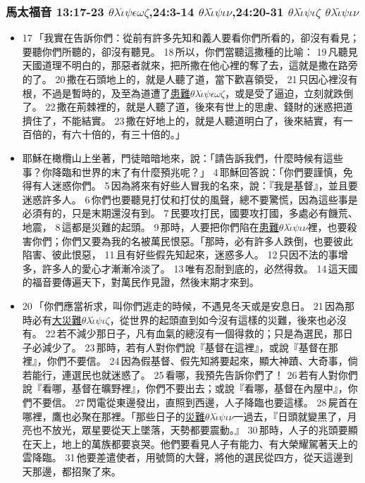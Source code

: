 \subsubsection{馬太福音 13:17-23 $\theta$$\lambda$$\acute{\iota}$$\psi$$\epsilon$$\omega$$\zeta$,24:3-14 $\theta$$\lambda$$\tilde{\iota}$$\psi$$\iota$$\nu$,24:20-31 $\theta$$\lambda$$\tilde{\iota}$$\psi$$\iota$$\zeta$ $\theta$$\lambda$$\tilde{\iota}$$\psi$$\iota$$\nu$}    
\begin{itemize} 
\itemsep-.25em
\item 17 「我實在告訴你們：從前有許多先知和義人要看你們所看的，卻沒有看見；要聽你們所聽的，卻沒有聽見。 18 所以，你們當聽這撒種的比喻： 19 凡聽見天國道理不明白的，那惡者就來，把所撒在他心裡的奪了去，這就是撒在路旁的了。 20 撒在石頭地上的，就是人聽了道，當下歡喜領受， 21 只因心裡沒有根，不過是暫時的，及至為道遭了\underline{患難$\theta$$\lambda$$\acute{\iota}$$\psi$$\epsilon$$\omega$$\zeta$}，或是受了逼迫，立刻就跌倒了。 22 撒在荊棘裡的，就是人聽了道，後來有世上的思慮、錢財的迷惑把道擠住了，不能結實。 23 撒在好地上的，就是人聽道明白了，後來結實，有一百倍的，有六十倍的，有三十倍的。」   
\item 耶穌在橄欖山上坐著，門徒暗暗地來，說：「請告訴我們，什麼時候有這些事？你降臨和世界的末了有什麼預兆呢？」 4 耶穌回答說：「你們要謹慎，免得有人迷惑你們。 5 因為將來有好些人冒我的名來，說：『我是基督』，並且要迷惑許多人。 6 你們也要聽見打仗和打仗的風聲，總不要驚慌，因為這些事是必須有的，只是末期還沒有到。 7 民要攻打民，國要攻打國，多處必有饑荒、地震， 8 這都是災難的起頭。 9 那時，人要把你們陷在\underline{患難$\theta$$\lambda$$\tilde{\iota}$$\psi$$\iota$$\nu$}裡，也要殺害你們；你們又要為我的名被萬民恨惡。「那時，必有許多人跌倒，也要彼此陷害、彼此恨惡， 11 且有好些假先知起來，迷惑多人。 12 只因不法的事增多，許多人的愛心才漸漸冷淡了。 13 唯有忍耐到底的，必然得救。 14 這天國的福音要傳遍天下，對萬民作見證，然後末期才來到。
\item 20 「你們應當祈求，叫你們逃走的時候，不遇見冬天或是安息日。 21 因為那時必有\underline{大災難$\theta$$\lambda$$\tilde{\iota}$$\psi$$\iota$$\zeta$}，從世界的起頭直到如今沒有這樣的災難，後來也必沒有。 22 若不減少那日子，凡有血氣的總沒有一個得救的；只是為選民，那日子必減少了。 23 那時，若有人對你們說『基督在這裡』，或說『基督在那裡』，你們不要信。 24 因為假基督、假先知將要起來，顯大神蹟、大奇事，倘若能行，連選民也就迷惑了。 25 看哪，我預先告訴你們了！ 26 若有人對你們說『看哪，基督在曠野裡』，你們不要出去；或說『看哪，基督在內屋中』，你們不要信。 27 閃電從東邊發出，直照到西邊，人子降臨也要這樣。 28 屍首在哪裡，鷹也必聚在那裡。「那些日子的\underline{災難$\theta$$\lambda$$\tilde{\iota}$$\psi$$\iota$$\nu$}一過去，『日頭就變黑了，月亮也不放光，眾星要從天上墜落，天勢都要震動。』 30 那時，人子的兆頭要顯在天上，地上的萬族都要哀哭。他們要看見人子有能力、有大榮耀駕著天上的雲降臨。 31 他要差遣使者，用號筒的大聲，將他的選民從四方，從天這邊到天那邊，都招聚了來。
\end{itemize}   
    
